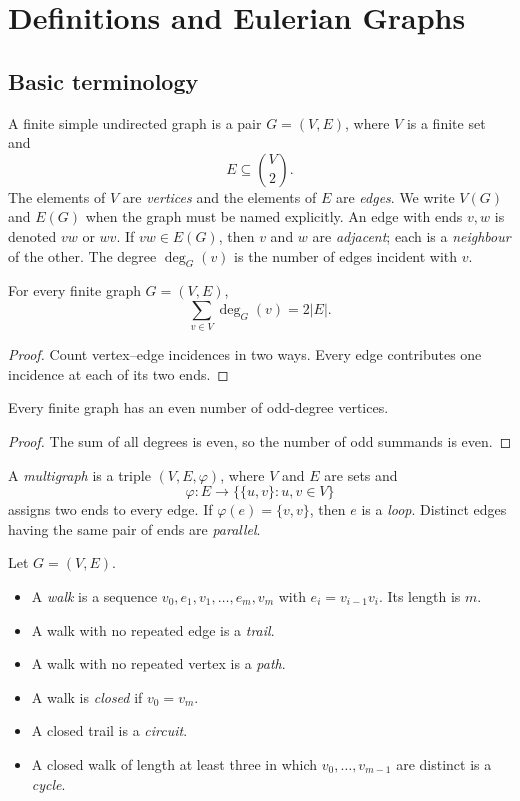 \chapter{Definitions and Eulerian Graphs}

\section{Basic terminology}

\begin{notedefinition}
A finite simple undirected graph is a pair $G=(V,E)$, where $V$ is a finite set and
\[
  E\subseteq \binom{V}{2}.
\]
The elements of $V$ are \emph{vertices} and the elements of $E$ are \emph{edges}.  We write $V(G)$ and $E(G)$ when the graph must be named explicitly.  An edge with ends $v,w$ is denoted $vw$ or $wv$.  If $vw\in E(G)$, then $v$ and $w$ are \emph{adjacent}; each is a \emph{neighbour} of the other.  The degree $\deg_G(v)$ is the number of edges incident with $v$.
\end{notedefinition}

\begin{notetheorem}
For every finite graph $G=(V,E)$,
\[
  \sum_{v\in V}\deg_G(v)=2|E|.
\]
\end{notetheorem}
\begin{proof}
Count vertex--edge incidences in two ways.  Every edge contributes one incidence at each of its two ends.
\end{proof}

\begin{notecorollary}
Every finite graph has an even number of odd-degree vertices.
\end{notecorollary}
\begin{proof}
The sum of all degrees is even, so the number of odd summands is even.
\end{proof}

\begin{notedefinition}
A \emph{multigraph} is a triple $(V,E,\varphi)$, where $V$ and $E$ are sets and
\[
  \varphi:E\longrightarrow \bigl\{\{u,v\}:u,v\in V\bigr\}
\]
assigns two ends to every edge.  If $\varphi(e)=\{v,v\}$, then $e$ is a \emph{loop}.  Distinct edges having the same pair of ends are \emph{parallel}.
\end{notedefinition}
\begin{notedefinition}
Let $G=(V,E)$.
\begin{itemize}
  \item A \emph{walk} is a sequence $v_0,e_1,v_1,\ldots,e_m,v_m$ with $e_i=v_{i-1}v_i$.  Its length is $m$.
  \item A walk with no repeated edge is a \emph{trail}.
  \item A walk with no repeated vertex is a \emph{path}.
  \item A walk is \emph{closed} if $v_0=v_m$.
  \item A closed trail is a \emph{circuit}.
  \item A closed walk of length at least three in which $v_0,\ldots,v_{m-1}$ are distinct is a \emph{cycle}.
\end{itemize}
\end{notedefinition}

